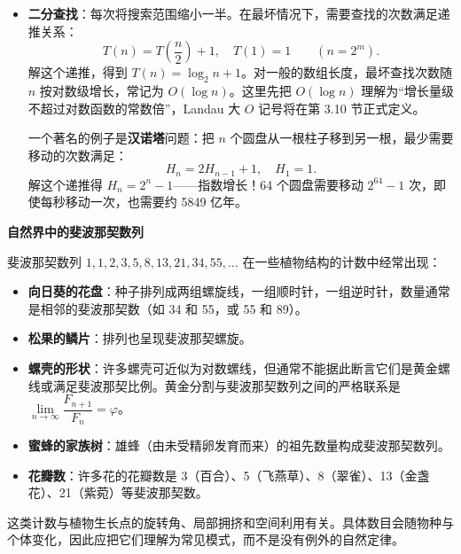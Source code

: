 \documentclass[fontset=fandol]{ctexart}
\begin{document}
\begin{itemize}
\item \textbf{二分查找}：每次将搜索范围缩小一半。在最坏情况下，需要查找的次数满足递推关系：
\[
T(n) = T\left(\dfrac{n}{2}\right) + 1,\quad T(1) = 1\qquad(n=2^m).
\]
解这个递推，得到 \(T(n)=\log_2 n+1\)。对一般的数组长度，最坏查找次数随 $n$ 按对数级增长，常记为 \(O(\log n)\)。这里先把 \(O(\log n)\) 理解为“增长量级不超过对数函数的常数倍”，Landau 大 \(O\) 记号将在第 3.10 节正式定义。


一个著名的例子是\textbf{汉诺塔}问题：把 \(n\) 个圆盘从一根柱子移到另一根，最少需要移动的次数满足：
\[
H_n = 2H_{n-1} + 1,\quad H_1 = 1.
\]
解这个递推得 \(H_n = 2^n - 1\)——指数增长！64 个圆盘需要移动 \(2^{64}-1\) 次，即使每秒移动一次，也需要约 5849 亿年。
\end{itemize}

\textbf{自然界中的斐波那契数列}

斐波那契数列 \(1, 1, 2, 3, 5, 8, 13, 21, 34, 55, \ldots\) 在一些植物结构的计数中经常出现：

\begin{itemize}
\item \textbf{向日葵的花盘}：种子排列成两组螺旋线，一组顺时针，一组逆时针，数量通常是相邻的斐波那契数（如 34 和 55，或 55 和 89）。
\item \textbf{松果的鳞片}：排列也呈现斐波那契螺旋。
\item \textbf{螺壳的形状}：许多螺壳可近似为对数螺线，但通常不能据此断言它们是黄金螺线或满足斐波那契比例。黄金分割与斐波那契数列之间的严格联系是 \(\lim\limits_{n \to \infty} \dfrac{F_{n+1}}{F_n}=\varphi\)。
\item \textbf{蜜蜂的家族树}：雄蜂（由未受精卵发育而来）的祖先数量构成斐波那契数列。
\item \textbf{花瓣数}：许多花的花瓣数是 3（百合）、5（飞燕草）、8（翠雀）、13（金盏花）、21（紫菀）等斐波那契数。
\end{itemize}

\begin{center}
\end{center}

这类计数与植物生长点的旋转角、局部拥挤和空间利用有关。具体数目会随物种与个体变化，因此应把它们理解为常见模式，而不是没有例外的自然定律。
\end{document}
